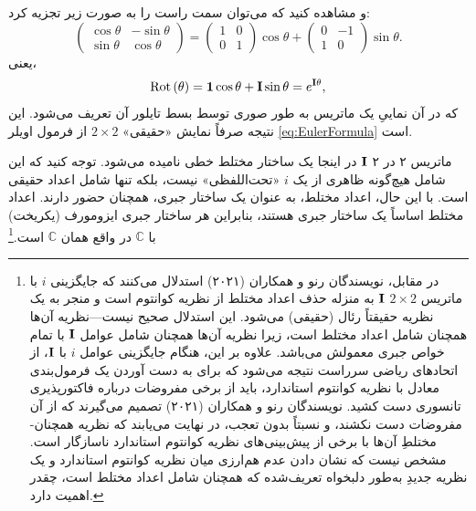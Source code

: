 \documentclass{article}
\begin{document}
و مشاهده کنید که می‌توان سمت راست را به صورت زیر تجزیه کرد:
\[
\begin{pmatrix}\cos\theta & -\sin\theta\\
\sin\theta & \cos\theta
\end{pmatrix}=\begin{pmatrix}1 & 0\\
0 & 1
\end{pmatrix}\cos\theta+\begin{pmatrix}0 & -1\\
1 & 0
\end{pmatrix}\sin\theta.
\]
 یعنی،
\begin{equation}
\operatorname{Rot}\left(\theta\right)=\mathbf{1}\cos\theta+\mathbf{I}\sin\theta=e^{\mathbf{I}\theta},\label{eq:2by2RotationMatrixAsReal2by2ComplexNumber}
\end{equation}
 که در آن نماییِ یک ماتریس به طور صوری توسط بسط تایلور آن تعریف می‌شود. این نتیجه صرفاً نمایش «حقیقی» $2\times2$ از فرمول اویلر \eqref{eq:EulerFormula} است.

ماتریس ۲ در ۲ $\mathbf{I}$ در اینجا یک ساختار مختلط خطی نامیده می‌شود. توجه کنید که این شامل هیچ‌گونه ظاهری از یک $i$ «تحت‌اللفظی» نیست، بلکه تنها شامل اعداد حقیقی است. با این حال، اعداد مختلط، به عنوان یک ساختار جبری، همچنان حضور دارند. اعداد مختلط اساساً یک ساختار جبری هستند، بنابراین هر ساختار جبری ایزومورف (یکریخت) با $\mathbb{C}$ در واقع همان $\mathbb{C}$ است.\footnote{در مقابل، نویسندگان رنو و همکاران (۲۰۲۱)\nocite{RenouTrilloWeilenmannThinhTavakoliGisinAcinNavascues:1999qmoarhs}
استدلال می‌کنند که جایگزینی $i$ با ماتریس $2\times2$ $\mathbf{I}$ به منزله حذف اعداد مختلط از نظریه کوانتوم است و منجر به یک نظریه حقیقتاً رئال (حقیقی) می‌شود. این استدلال صحیح نیست—نظریه آن‌ها همچنان شامل اعداد مختلط است، زیرا نظریه آن‌ها همچنان شامل عوامل $\mathbf{I}$ با تمام خواص جبری معمولش می‌باشد.
علاوه بر این، هنگام جایگزینی عوامل $i$ با $\mathbf{I}$، از اتحادهای ریاضی سرراست نتیجه می‌شود که برای به دست آوردن یک فرمول‌بندی معادل با نظریه کوانتوم استاندارد، باید از برخی مفروضات درباره فاکتورپذیری تانسوری دست کشید. نویسندگان رنو و همکاران (۲۰۲۱) تصمیم می‌گیرند که از آن مفروضات دست نکشند، و نسبتاً بدون تعجب، در نهایت می‌یابند که نظریه همچنان-مختلطِ آن‌ها با برخی از پیش‌بینی‌های نظریه کوانتوم استاندارد ناسازگار است. مشخص نیست که نشان دادن عدم هم‌ارزی میان نظریه کوانتوم استاندارد و یک نظریه جدیدِ به‌طور دلبخواه تعریف‌شده که همچنان شامل اعداد مختلط است، چقدر اهمیت دارد.}
\end{document}
